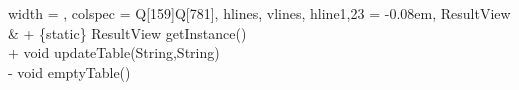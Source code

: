 \begin{longtblr}[
    label = none,
    entry = none,
  ]{
    width = \linewidth,
    colspec = {Q[159]Q[781]},
    hlines,
    vlines,
    hline{1,23} = {-}{0.08em},
  }
  ResultView             & {+ \{static\} ResultView getInstance()\\+ void updateTable(String,String)\\- void emptyTable()}                                                                                                                                                                                                                                                                                                                                                                                                                                                                                                                                                                                                                                                                                                                                                                                                                                                                                                                                                                                                                                                                                                                                                                                                                                                                                                                                                                                                                                                                                                                                                                                                                                                                                                                                                                                                 \\

\end{longtblr}
